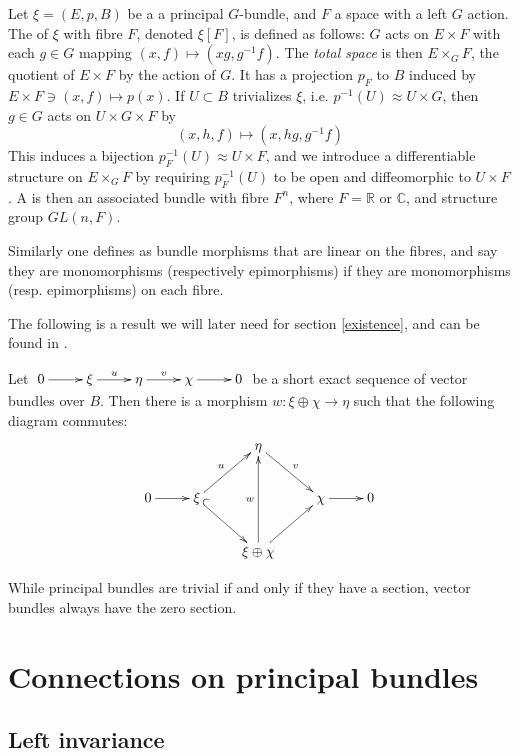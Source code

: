 \begin{definition}
 Let $\xi=(E,p,B)$ be a a principal $G$-bundle, and $F$ a space with a left $G$ action. The  of $\xi$ with fibre $F$, denoted $\xi[F]$, is defined as follows:
$G$ acts on $E\times F$ with each $g\in G$ mapping $(x,f)\mapsto (xg,g^{-1}f)$. The \emph{total space} is then $E\times_G F$, the quotient of $E\times F$ by the action of $G$. It has a projection $p_F$ to $B$ induced by $E\times F\ni(x,f)\mapsto p(x)$. If $U\subset B$ trivializes $\xi$, i.e. $p^{-1}(U) \approx U\times G$, then $g\in G$ acts on $U\times G\times F$ by \[
(x,h,f)\mapsto (x,hg,g^{-1}f)                                                                                      \]
This induces a bijection $p^ {-1}_F(U)\approx U\times F$, and we introduce a differentiable structure on $E\times_G F$ by requiring $p_F^{-1}(U)$ to be open and diffeomorphic to $U\times F$.
A  is then an associated bundle with fibre $F^n$, where $F=\mathbb{R}$ or $\mathbb{C}$, and structure group $GL(n,F)$.
\end{definition}

Similarly one defines  as bundle morphisms that are linear on the fibres, and say they are monomorphisms (respectively epimorphisms) if they are monomorphisms (resp. epimorphisms) on each fibre.

The following is a result we will later need for section \ref{existence}, and can be found in \cite[p.37]{husemoller}.
\begin{theorem}\label{exactseq}
 Let $\xymatrix{0\ar[r]&\xi\ar[r]^u & \eta \ar[r]^v &\chi \ar[r] & 0}$ be a short exact sequence of vector bundles over $B$. Then there is a morphism $w:\xi\oplus\chi \rightarrow \eta$ such that the following diagram commutes:
\[
 \xymatrix{ & &\eta\ar[dr]^v & & \\
0\ar[r]&\xi\ar[ur]^u \ar@{^{(}->}[dr] & &\chi\ar[r] & 0\\
&&\xi\oplus\chi\ar[uu]^w \ar[ur]&&}
\]
\end{theorem}
While principal bundles are trivial if and only if they have a section, vector bundles always have the zero section. 

\section{Connections on principal bundles}
\subsection{Left invariance}

